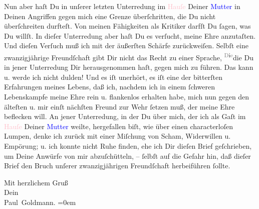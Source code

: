 \pstart
           Nun aber haſt Du in unſerer letzten Unterredung im \textcolor{pink}{Hauſe}{}\ledrightnote{{$\rightarrow$}\textcolor{pink}{Frankgasse}} Deiner \textcolor{blue}{Mutter}{}\ledrightnote{{$\rightarrow$}\textcolor{blue}{Louise Schnitzler}} in Deinen Angriffen gegen mich eine Grenze
               überſchritten, die Du {\pb}nicht überſchreiten
               durfteſt. Von meinen Fähigkeiten als Kritiker darfſt Du ſagen, was Du willſt. In
               dieſer Unterredung aber haſt Du es verſucht, meine Ehre anzutaſten. Und dieſen
               Verſuch muß ich mit der äußerſten Schärfe zurückweiſen.  Selbſt eine
               zwanzigjährige Freundſchaft gibt Dir nicht das Recht zu einer Sprache, \substVorne{}\textsuperscript{\textcolor{gray}{D}i\textcolor{gray}{e}}\substDazwischen{}die\substHinten{} Du in jener Unterredung Dir herausgenommen haſt, gegen mich zu führen. Das
               kann u. werde ich nicht {\pb}dulden! Und es iſt  unerhört, es iſt eine der bitterſten Erfahrungen
               meines Lebens, daß ich, nachdem ich in einem ſchweren Lebenskampfe meine Ehre rein u.
               flankenlos erhalten habe, mich nun gegen den älteſten u. mir einſt nächſten Freund
               zur Wehr ſetzen  muß, der meine Ehre \strikeout{\textcolor{gray}{bef}} beflecken will. An jener Unterredung, in der  Du über mich, der ich als Gaſt im \textcolor{pink}{Hauſe}{}\ledrightnote{{$\rightarrow$}\textcolor{pink}{Frankgasse}} Deiner \textcolor{blue}{Mutter}{}\ledrightnote{{$\rightarrow$}\textcolor{blue}{Louise Schnitzler}} weilte, {\pb}\strikeout{\textcolor{gray}{×}\-\textcolor{gray}{×}\-\textcolor{gray}{×}\-\textcolor{gray}{×}\-\textcolor{gray}{×}\-\textcolor{gray}{×}} hergefallen biſt, wie über einen characterloſen Lumpen, denke ich zurück mit
               einer Miſchung von Scham, Widerwillen u. Empörung; u. ich konnte nicht Ruhe finden,
               ehe ich Dir dieſen Brief geſchrieben, um Deine Anwürfe von mir abzuſchütteln, –
               ſelbſt auf die Gefahr hin, daß dieſer Brief den Bruch unſerer zwanzigjährigen
               Freundſchaft herbeiführen ſollte.\pend
           
\pstart
           {\pb}Mit herzlichem Gruß {\\[\baselineskip]}Dein {\\[\baselineskip]}\spacefill\mbox{Paul Goldmann.}\pend
           \leftskip=0em{}\endnumbering{}
\begin{anhang}
\end{anhang}
      